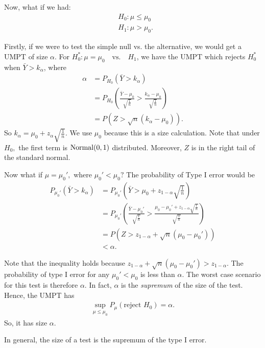 \begin{eg}
\label{eg:NormalUMPT}
Now, what if we had:
\begin{align*}
	&H_0: \mu\leq \mu_0 \\
	&H_1:\mu>\mu_0
.\end{align*}

Firstly, if we were to test the simple null vs. the alternative, we would get a UMPT of size $\alpha$. For $H_0^*:\mu=\mu_0 \quad \text{vs.} \quad H_1$, we have the UMPT which rejects $H_0^*$ when $\bar{Y}>k_\alpha$, where 
\begin{align*}
	\alpha&=P_{H_0}(\bar{Y}>k_\alpha)\\
	      &=P_{H_0}\left( \frac{\bar{Y}-\mu_0}{\sqrt{\frac{1}{n}}} > \frac{k_\alpha-\mu_0}{\sqrt{\frac{1}{n}}}  \right)\\
	      &= P(Z>\sqrt{n}(k_\alpha-\mu_0)) 
.\end{align*}  
So $k_\alpha=\mu_0+z_\alpha\sqrt{\frac{1}{n}}$.
We use $\mu_0$ because this is a size calculation. Note that under $H_0,$ the first term is $\operatorname*{Normal}(0,1)$ distributed. 
Moreover, $Z$ is in the right tail of the standard normal.


Now what if $\mu=\mu_0',$ where $\mu_0'<\mu_0?$ The probability of Type I error would be 
\begin{align*}
	P_{\mu_0'}(\bar{Y}>k_{\alpha}) 
	&=P_{\mu_0'}\left(\bar{Y}>\mu_0+z_{1-\alpha}\sqrt{\frac{1}{n}}\right) \\
	&=P_{\mu_0'}\left(\frac{\bar{Y}-\mu_0'}{\sqrt{\frac{1}{n}}} >\frac{\mu_0-\mu_0'+z_{1-\alpha}\sqrt{\frac{1}{n}}}{\sqrt{\frac{1}{n}}}\right)\\ 
	&=P(Z>z_{1-\alpha}+\sqrt{n} (\mu_0-\mu_0') ) \\
	&<\alpha.
\end{align*}

Note that the inequality holds because $z_{1-\alpha}+\sqrt{n} (\mu_0-\mu_0') > z_{1-\alpha}$. The probability of type I error for any $\mu_0'<\mu_0$ is less than $\alpha.$ The worst case scenario for this test is therefore $\alpha$. In fact,  $\alpha$ is the \textit{supremum} of the size of the test. Hence, the UMPT has
\begin{align*}
	\sup_{\mu\leq \mu_0}P_\mu(\text{reject } H_0)=\alpha
.\end{align*}
So, it has size $\alpha.$ 
\end{eg}

\begin{recall}
	In general, the size of a test is the supremum of the type I error.
\end{recall}	

